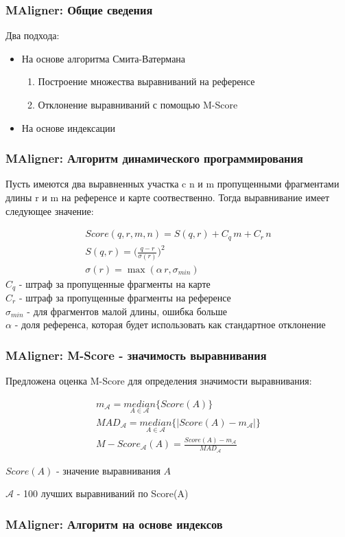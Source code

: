 \begin{frame}
\frametitle{MAligner: Общие сведения}
Два подхода:
\begin{itemize}
  \item На основе алгоритма Смита-Ватермана
  \begin{enumerate}
    \item Построение множества выравниваний на референсе
    \item Отклонение выравниваний с помощью M-Score
  \end{enumerate}
  \item На основе индексации
\end{itemize}
\end{frame}

\begin{frame}
\frametitle{MAligner: Алгоритм динамического программирования}

Пусть имеются два выравненных участка c n и m пропущенными фрагментами длины r и m на референсе и карте соотвественно.
Тогда выравнивание имеет следующее значение:

\begin{gather*}
Score(q, r, m, n) = S(q, r) + C_q \,m + C_r \, n \\
S(q, r) = \bigg(\frac{q - r}{\sigma(r)}\bigg)^2 \\
\sigma(r) = \max(\alpha \, r, \sigma_{min})
\end{gather*}
$C_q$ - штраф за пропущенные фрагменты на карте \\
$C_r$ - штраф за пропущенные фрагменты на референсе \\
$\sigma_{min}$ - для фрагментов малой длины, ошибка больше \\
$\alpha$ - доля референса, которая будет использовать как стандартное отклонение
\end{frame}

\begin{frame}
\frametitle{MAligner: M-Score - значимость выравнивания}

Предложена оценка M-Score для определения значимости выравнивания:

\begin{gather*}
  m_{\mathcal{A}} = \underset{A \in \mathcal{A}}{median}\{Score(A)\} \\
  MAD_{\mathcal{A}} = \underset{A \in \mathcal{A}}{median}\{ | Score(A) - m_{\mathcal{A}}|\} \\
  M-Score_{\mathcal{A}}(A) = \frac{Score(A) - m_{\mathcal{A}}}{MAD_{\mathcal{A}}}
\end{gather*}

$Score(A)$ - значение выравнивания $A$

$\mathcal{A}$ - 100 лучших выравниваний по Score(A)
\end{frame}


\begin{frame}
\frametitle{MAligner: Алгоритм на основе индексов}

\end{frame}
